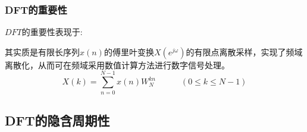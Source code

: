 \documentclass[notheorems,compress,mathserif,table]{beamer}
\begin{document}
%
%
%
\begin{frame}\frametitle{DFT的重要性}%

{\heiti $DFT$的重要性表现于:\par\quad}
\newline
其实质是有限长序列$x(n)$的傅里叶变换$X(e^{j\omega})$的有限点离散采样，实现了频域离散化，从而可在频域采用数值计算方法进行数字信号处理。
$$X(k) = \sum_{n=0}^{N-1}x(n) W_N^{kn} \quad\quad\quad (0 \leq k \leq N-1) $$
\end{frame}






\subsection{DFT的隐含周期性}
\end{document}
